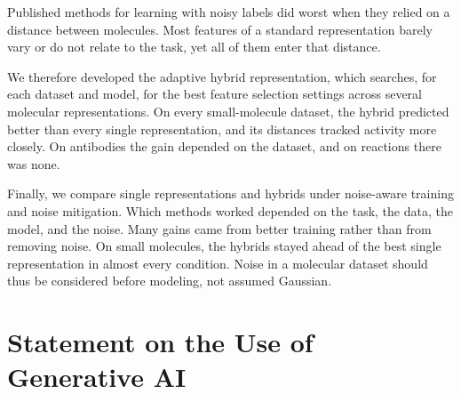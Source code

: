 \documentclass[a4paper,12pt]{report}
\begin{document}
Published methods for learning with noisy labels did worst when they relied on a distance between molecules. Most features of a standard representation barely vary or do not relate to the task, yet all of them enter that distance.

We therefore developed the adaptive hybrid representation, which searches, for each dataset and model, for the best feature selection settings across several molecular representations. On every small-molecule dataset, the hybrid predicted better than every single representation, and its distances tracked activity more closely. On antibodies the gain depended on the dataset, and on reactions there was none.

Finally, we compare single representations and hybrids under noise-aware training and noise mitigation. Which methods worked depended on the task, the data, the model, and the noise. Many gains came from better training rather than from removing noise. On small molecules, the hybrids stayed ahead of the best single representation in almost every condition. Noise in a molecular dataset should thus be considered before modeling, not assumed Gaussian.


%   
%   

%
\chapter*{Statement on the Use of Generative AI}
\end{document}

